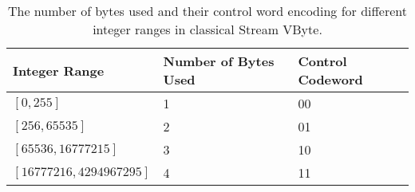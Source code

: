 \begin{table}
    \caption{The number of bytes used and their control word encoding for different integer ranges in classical Stream VByte. \label{tab:svb-classical}}
    \begin{tabular}{|l|l|l|}%
        \hline
        Integer Range & Number of Bytes Used & Control Codeword\\
        \hline
	$[0,255]$ & 1 & 00\\
	$[256,65535]$ & 2 & 01\\
	$[65536,16777215]$ & 3 & 10\\
	$[16777216,4294967295]$ & 4 & 11\\
        \hline
    \end{tabular}
\end{table}

